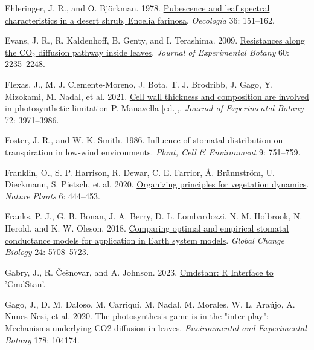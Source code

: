 \documentclass[
  letterpaper,
  DIV=11,
  numbers=noendperiod]{scrartcl}
\newlength{\cslhangindent}
\newlength{\cslentryspacingunit} %
\newenvironment{CSLReferences}[2] %
 {%
  \setlength{\parindent}{0pt}
  \ifodd #1
  \let\oldpar\par
  \def\par{\hangindent=\cslhangindent\oldpar}
  \fi
  \setlength{\parskip}{#2\cslentryspacingunit}
 }%
 {}
\begin{document}
\begin{CSLReferences}{1}{0}
\leavevmode{}%
Ehleringer, J. R., and O. Björkman. 1978.
\href{https://doi.org/10.1007/BF00349805}{Pubescence and leaf spectral
characteristics in a desert shrub, {Encelia} farinosa}. \emph{Oecologia}
36: 151--162.

\leavevmode{}%
Evans, J. R., R. Kaldenhoff, B. Genty, and I. Terashima. 2009.
\href{https://doi.org/10.1093/jxb/erp117}{Resistances along the
{CO}\(_{\textrm{2}}\) diffusion pathway inside leaves}. \emph{Journal of
Experimental Botany} 60: 2235--2248.

\leavevmode{}%
Flexas, J., M. J. Clemente-Moreno, J. Bota, T. J. Brodribb, J. Gago, Y.
Mizokami, M. Nadal, et al. 2021.
\href{https://doi.org/10.1093/jxb/erab144}{Cell wall thickness and
composition are involved in photosynthetic limitation} P. Manavella
{[}ed.{]},. \emph{Journal of Experimental Botany} 72: 3971--3986.

\leavevmode{}%
Foster, J. R., and W. K. Smith. 1986. Influence of stomatal distribution
on transpiration in low-wind environments. \emph{Plant, Cell \&
Environment} 9: 751--759.

\leavevmode{}%
Franklin, O., S. P. Harrison, R. Dewar, C. E. Farrior, Å. Brännström, U.
Dieckmann, S. Pietsch, et al. 2020.
\href{https://doi.org/10.1038/s41477-020-0655-x}{Organizing principles
for vegetation dynamics}. \emph{Nature Plants} 6: 444--453.

\leavevmode{}%
Franks, P. J., G. B. Bonan, J. A. Berry, D. L. Lombardozzi, N. M.
Holbrook, N. Herold, and K. W. Oleson. 2018.
\href{https://doi.org/10.1111/gcb.14445}{Comparing optimal and empirical
stomatal conductance models for application in {Earth} system models}.
\emph{Global Change Biology} 24: 5708--5723.

\leavevmode{}%
Gabry, J., R. Češnovar, and A. Johnson. 2023.
\href{https://mc-stan.org/cmdstanr,\%20https://discourse.mc-stan.org}{Cmdstanr:
{R} {Interface} to '{CmdStan}'}.

\leavevmode{}%
Gago, J., D. M. Daloso, M. Carriquí, M. Nadal, M. Morales, W. L. Araújo,
A. Nunes-Nesi, et al. 2020.
\href{https://doi.org/10.1016/j.envexpbot.2020.104174}{The
photosynthesis game is in the "inter-play": {Mechanisms} underlying
{CO2} diffusion in leaves}. \emph{Environmental and Experimental Botany}
178: 104174.


\end{CSLReferences}
\end{document}
